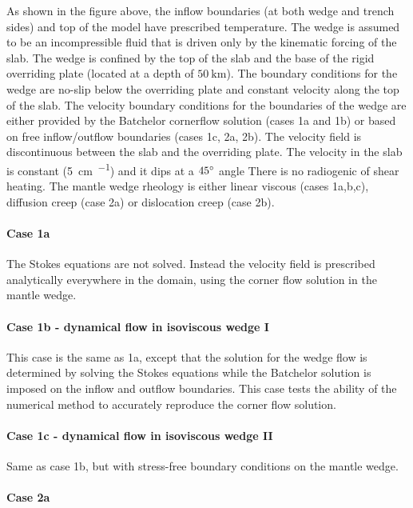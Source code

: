 As shown in the figure above, 
the inflow boundaries (at both wedge and trench sides) and top of the model 
have prescribed temperature. The wedge is assumed to be an incompressible fluid that
is driven only by the kinematic forcing of the slab. The wedge is
confined by the top of the slab and the base of the rigid overriding
plate (located at a depth of $50~\si{\km}$). 
The boundary conditions for the wedge are no-slip below the overriding plate and constant velocity
along the top of the slab. The velocity boundary conditions for the
boundaries of the wedge are either provided by the Batchelor cornerflow 
solution (cases 1a and 1b) or based on free inflow/outflow
boundaries (cases 1c, 2a, 2b). The velocity field is discontinuous between the slab
and the overriding plate.
The velocity in the slab is constant (5~\si{\cm\per\year}) and it dips at a $45\degree$ angle
There is no radiogenic of shear heating.
The mantle wedge rheology is either linear viscous (cases 1a,b,c),
diffusion creep (case 2a) or dislocation creep (case 2b).





\paragraph{Case 1a} The Stokes equations are not solved. Instead the velocity field
is prescribed analytically everywhere in the domain, using the corner flow solution 
in the mantle wedge. 

\paragraph{Case 1b - dynamical flow in isoviscous wedge I}
This case is the same as 1a, except that the solution
for the wedge flow is determined by solving the Stokes equations while the Batchelor solution is
imposed on the inflow and outflow boundaries. This case tests the ability of the numerical method
to accurately reproduce the corner flow solution.

\paragraph{Case 1c - dynamical flow in isoviscous wedge II} 
Same as case 1b, but with stress-free boundary conditions on the mantle wedge.

\paragraph{Case 2a}

